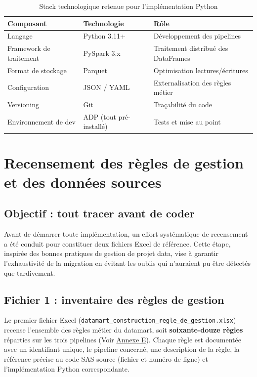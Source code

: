 \begin{table}[H]
    \centering
    \caption{Stack technologique retenue pour l'implémentation Python}
    \label{tab:stack}
    \vspace{0.2cm}
    \begin{tabularx}{\textwidth}{|l|l|X|}
        \hline
        \textbf{Composant} & \textbf{Technologie} & \textbf{Rôle} \\
        \hline
        Langage & Python 3.11+ & Développement des pipelines \\
        \hline
        Framework de traitement & PySpark 3.x & Traitement distribué des DataFrames \\
        \hline
        Format de stockage & Parquet & Optimisation lectures/écritures \\
        \hline
        Configuration & JSON / YAML & Externalisation des règles métier \\
        \hline
        Versioning & Git & Traçabilité du code \\
        \hline
        Environnement de dev & ADP (tout pré-installé) & Tests et mise au point \\
        \hline
    \end{tabularx}
\end{table}

\section{Recensement des règles de gestion et des données sources}

\subsection{Objectif : tout tracer avant de coder}

Avant de démarrer toute implémentation, un effort systématique de recensement a été conduit pour constituer deux fichiers Excel de référence. Cette étape, inspirée des bonnes pratiques de gestion de projet data, vise à garantir l'exhaustivité de la migration en évitant les oublis qui n'auraient pu être détectés que tardivement.

\subsection{Fichier 1 : inventaire des règles de gestion}

Le premier fichier Excel (\texttt{datamart\_construction\_regle\_de\_gestion.xlsx}) recense l'ensemble des règles métier du datamart, soit \textbf{soixante-douze règles} réparties sur les trois pipelines (Voir \hyperlink{annexe.E}{Annexe E}). Chaque règle est documentée avec un identifiant unique, le pipeline concerné, une description de la règle, la référence précise au code SAS source (fichier et numéro de ligne) et l'implémentation Python correspondante.

